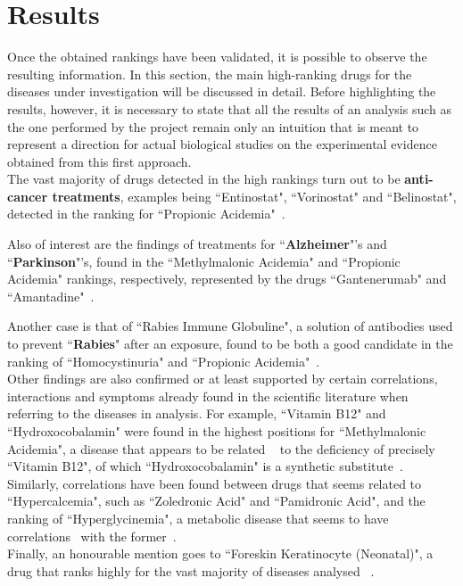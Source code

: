 \chapter{Results}\label{chap:results_rankings}

Once the obtained rankings have been validated, it is possible to observe the resulting information. In this section, the main high-ranking drugs for the diseases under investigation will be discussed in detail. Before highlighting the results, however, it is necessary to state that all the results of an analysis such as the one performed by the project remain only an intuition that is meant to represent a direction for actual biological studies on the experimental evidence obtained from this first approach.
~\\[0.3cm]
The vast majority of drugs detected in the high rankings turn out to be \textbf{anti-cancer treatments}, examples being ``Entinostat", ``Vorinostat" and ``Belinostat", detected in the ranking for ``Propionic Acidemia"~\cite{drugbank}.

Also of interest are the findings of treatments for ``\textbf{Alzheimer}"'s and ``\textbf{Parkinson}"'s, found in the ``Methylmalonic Acidemia" and ``Propionic Acidemia" rankings, respectively, represented by the drugs ``Gantenerumab" and ``Amantadine"~\cite{drugbank}.

Another case is that of ``Rabies Immune Globuline", a solution of antibodies used to prevent ``\textbf{Rabies}" after an exposure, found to be both a good candidate in the ranking of ``Homocystinuria" and ``Propionic Acidemia"~\cite{drugbank}.
~\\[0.01cm]
Other findings are also confirmed or at least supported by certain correlations, interactions and symptoms already found in the scientific literature when referring to the diseases in analysis.
For example, ``Vitamin B12" and ``Hydroxocobalamin" were found in the highest positions for ``Methylmalonic Acidemia", a disease that appears to be related ~\cite{pubmed1} to the deficiency of precisely ``Vitamin B12", of which ``Hydroxocobalamin" is a synthetic substitute~\cite{drugbank}.
Similarly, correlations have been found between drugs that seems related to ``Hypercalcemia", such as ``Zoledronic Acid" and ``Pamidronic Acid", and the ranking of ``Hyperglycinemia", a metabolic disease that seems to have correlations~\cite{pubmed2} with the former~\cite{drugbank}.
~\\[0.3cm]
Finally, an honourable mention goes to ``Foreskin Keratinocyte (Neonatal)", a drug that ranks highly for the vast majority of diseases analysed ~\cite{drugbank}.

